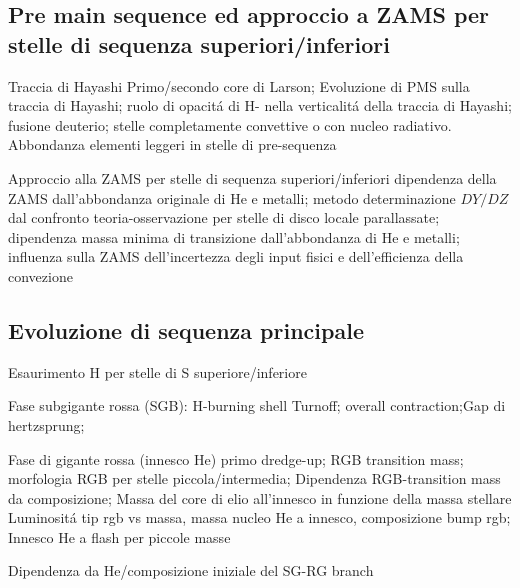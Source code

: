 \subsection{Pre main sequence ed approccio a ZAMS per stelle di sequenza superiori/inferiori}

\begin{frame}{Traccia di Hayashi}
Primo/secondo core di Larson; Evoluzione di PMS sulla traccia di Hayashi; ruolo di opacit\'a di H- nella verticalit\'a della traccia di Hayashi; fusione deuterio; stelle completamente convettive o con nucleo radiativo. Abbondanza elementi leggeri in stelle di pre-sequenza
\end{frame}

\begin{frame}{Approccio alla ZAMS per stelle di sequenza superiori/inferiori}
dipendenza della ZAMS dall'abbondanza originale di He e metalli; metodo determinazione $DY/DZ$ dal confronto teoria-osservazione per stelle di disco locale parallassate; dipendenza massa minima di transizione dall'abbondanza di He e metalli; influenza sulla ZAMS dell'incertezza degli input fisici e dell'efficienza della convezione
\end{frame}

\subsection{Evoluzione di sequenza principale}

\begin{frame}{Esaurimento H per stelle di S superiore/inferiore}

\end{frame}

\begin{frame}{Fase subgigante rossa (SGB): H-burning shell}
Turnoff; overall contraction;Gap di hertzsprung;
\end{frame}

\begin{frame}{Fase di gigante rossa (innesco He)}
primo dredge-up; RGB transition mass; morfologia RGB per stelle piccola/intermedia;
Dipendenza RGB-transition mass da composizione;
Massa del core di elio all'innesco in funzione della massa stellare
Luminosit\'a tip rgb vs massa, massa nucleo He a innesco, composizione
bump rgb;
Innesco He a flash per piccole masse
\end{frame}

\begin{frame}{Dipendenza da He/composizione iniziale del SG-RG branch}

\end{frame}

